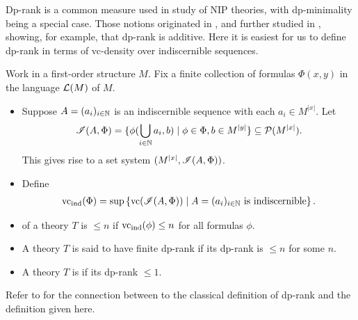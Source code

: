 

Dp-rank is a common measure used in study of NIP theories, with dp-minimality being a special case.
Those notions originated in \cite{shelah_dp}, and further studied in \cite{dp_add}, showing, for example, that dp-rank is additive.
Here it is easiest for us to define dp-rank in terms of vc-density over indiscernible sequences.

\begin{Definition} \label{def_dp}
  Work in a first-order structure $M$.
  Fix a finite collection of formulas $\Phi(x, y)$ in the language $\mathcal L(M)$ of $M$.
  \begin{itemize}
  \item Suppose $A = (a_i)_{i \in \mathbb{N}}$ is an indiscernible sequence with each $a_i \in M^{|x|}$.
    Let
    \begin{align*}
      \mathscr I(A, \Phi) = \{\phi(\bigcup_{i \in \mathbb{N}} a_i, b) \mid \phi \in \Phi, b \in M^{|y|}\} \subseteq \mathcal P(M^{|x|}).     
    \end{align*}
    This gives rise to a set system $(M^{|x|}, \mathscr I(A, \Phi))$.
  \item Define
    \begin{align*}
      \operatorname{vc}_{\operatorname{ind}}(\Phi) = \sup \left\{\operatorname{vc}(\mathscr I(A, \Phi)) \mid A = (a_i)_{i \in \mathbb{N}} \text{ is indiscernible}\right\}.
    \end{align*}
  \item {} of a theory $T$ is $\leq n$ if $\operatorname{vc}_{\operatorname{ind}}(\phi) \leq n$ for all formulas $\phi$.
  \item A theory $T$ is said to have finite dp-rank if its dp-rank is $\leq n$ for some $n$.
  \item A theory $T$ is  if its dp-rank $\leq 1$.
  \end{itemize}
\end{Definition}

Refer to \cite{guingona} for the connection between to the classical definition of dp-rank and the definition given here.
